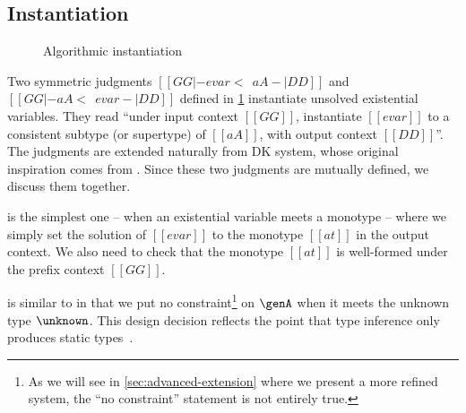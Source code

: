 \subsection{Instantiation}
\label{sec:algo:instantiate}

\begin{figure}[t]
  \centering
  \begin{small}



  \end{small}
  \caption{Algorithmic instantiation}
  \label{fig:algo:instantiate}
\end{figure}

Two symmetric judgments $[[ GG |- evar <~~ aA -| DD ]]$ and $[[ GG |- aA <~~ evar -| DD ]]$
defined in \cref{fig:algo:instantiate} instantiate unsolved
existential variables. They read ``under input context $[[GG]]$, instantiate $[[evar]]$ to a consistent
subtype (or supertype) of $[[aA]]$, with output context $[[DD]]$''. The judgments are extended naturally from
DK system, whose original inspiration comes from
\citet{cardelli1993implementation}. Since these two judgments are mutually
defined, we discuss them together.

 is the simplest one -- when an existential variable meets a
monotype -- where we simply set the solution of $[[evar]]$ to the monotype
$[[at]]$ in the output context. We also need to check that the monotype $[[at]]$
is well-formed under the prefix context $[[GG]]$.

 is similar to  in that we put no
constraint\footnote{As we will see in \cref{sec:advanced-extension} where we
  present a more refined system, the ``no constraint'' statement is not entirely
  true. } on $\genA$ when it meets the unknown type $\unknown$. This design
decision reflects the point that type inference only produces static
types~\citep{garcia2015principal}.


